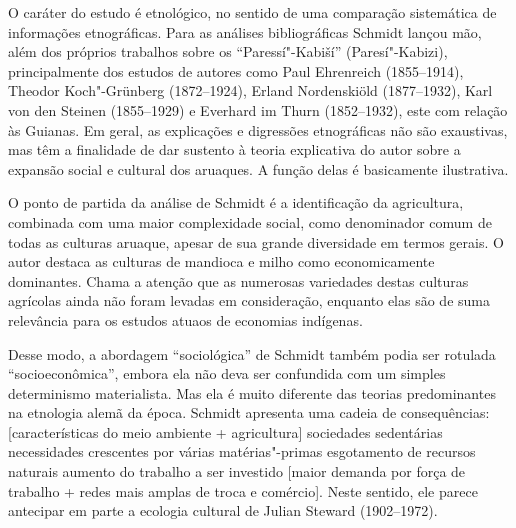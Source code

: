 O caráter do estudo é etnológico, no sentido de uma comparação
sistemática de informações etnográficas. Para as análises
bibliográficas Schmidt lançou mão, além dos próprios trabalhos sobre os
``Paressí"-Kabiší'' (Paresí"-Kabizi), principalmente dos estudos de
autores como Paul Ehrenreich (1855--1914), Theodor Koch"-Grünberg
(1872--1924), Erland Nordenskiöld (1877--1932), Karl von den Steinen
(1855--1929) e Everhard im Thurn (1852--1932), este com relação às
Guianas. Em geral, as explicações e digressões etnográficas não são
exaustivas, mas têm a finalidade de dar sustento à teoria explicativa do
autor sobre a expansão social e cultural dos aruaques. A função delas é
basicamente ilustrativa.

O ponto de partida da análise de Schmidt é a identificação da
agricultura, combinada com uma maior complexidade social, como
denominador comum de todas as culturas aruaque, apesar de sua grande
diversidade em termos gerais. O autor destaca as culturas de mandioca e
milho como economicamente dominantes. Chama a atenção que as numerosas
variedades destas culturas agrícolas ainda não foram levadas em
consideração, enquanto elas são de suma relevância para os estudos
atuaos de economias indígenas.

Desse modo, a abordagem ``sociológica'' de Schmidt também podia ser
rotulada ``socioeconômica'', embora ela não deva ser confundida com um
simples determinismo materialista. Mas ela é muito diferente das teorias
predominantes na etnologia alemã da época. Schmidt apresenta uma cadeia
de consequências: {[}características do meio ambiente + agricultura{]} \rightarrow{}
sociedades sedentárias \rightarrow{} necessidades crescentes por várias
matérias"-primas \rightarrow{} esgotamento de recursos naturais \rightarrow{} aumento do trabalho a
ser investido \rightarrow{} {[}maior demanda por força de trabalho + redes mais amplas
de troca e comércio{]}. Neste sentido, ele parece antecipar em parte a
ecologia cultural de Julian Steward (1902--1972).

